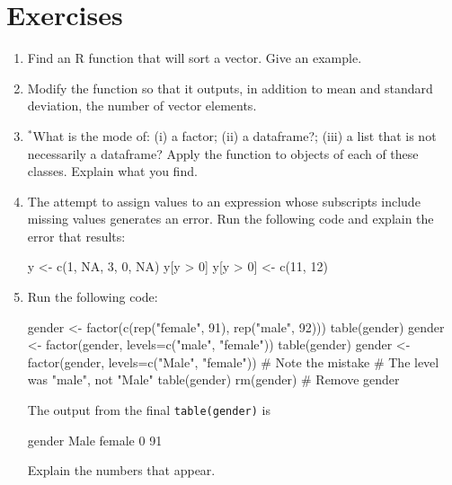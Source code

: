 \section{Exercises}\label{sec:objects-ex}


\begin{enumerate}

\item  Find an R function that will sort a vector. Give an example.

\item  Modify the function  so that it outputs,
in addition to mean and standard deviation, the number of
vector elements.

\item $^*$What is the mode of: (i) a factor; (ii) a dataframe?;
(iii) a list that is not necessarily a dataframe?
Apply the function  to objects of each
of these classes.  Explain what you find.

\item The attempt to assign values to an expression whose
subscripts include missing values generates an error.
Run the following code and explain the error that results:
\begin{Schunk}
\begin{Sinput}
y <- c(1, NA, 3, 0, NA)
y[y > 0]
y[y > 0] <- c(11, 12)
\end{Sinput}
\end{Schunk}

\item Run the following code:
\begin{fullwidth}

\begin{Schunk}
\begin{Sinput}
gender <- factor(c(rep("female", 91), rep("male", 92)))
table(gender)
gender <- factor(gender, levels=c("male", "female"))
table(gender)
gender <- factor(gender, levels=c("Male", "female")) # Note the mistake
# The level was "male", not "Male"
table(gender)
rm(gender)                  # Remove gender
\end{Sinput}
\end{Schunk}

\end{fullwidth}
The output from the final \verb!table(gender)! is

\begin{Schunk}
\begin{Soutput}
gender
  Male female 
     0     91 
\end{Soutput}
\end{Schunk}
Explain the numbers that appear.


\end{enumerate}
